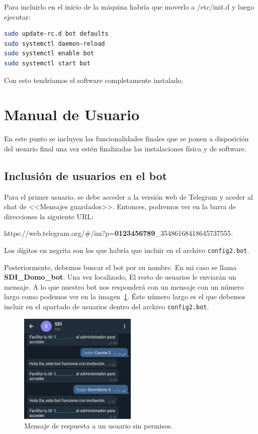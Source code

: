 Para incluirlo en el inicio de la máquina habría que moverlo a /etc/init.d y luego ejecutar: 
\begin{lstlisting}[language=sh, firstnumber=0, caption={Líneas para incluir el demonio en el inicio.}]  
sudo update-rc.d bot defaults
sudo systemctl daemon-reload
sudo systemctl enable bot
sudo systemctl start bot
\end{lstlisting}  

Con esto tendríamos el software completamente instalado.

\section{Manual de Usuario}
En este punto se incluyen las funcionalidades finales que se ponen a disposición del usuario final una vez estén finalizadas las instalaciones física y de software.

\subsection{Inclusión de usuarios en el bot}
Para el primer usuario, se debe acceder a la versión web de Telegram y aceder al chat de <<Mensajes guardados>>. Entonces, podremos ver en la barra de direcciones la siguiente URL:

\mbox{https://web.telegram.org/#/im?p=\textbf{0123456789}\_35486168418645737555}. 

Los dígitos en negrita son los que habría que incluir en el archivo \texttt{config2.bot}.

Posteriormente, debemos buscar el bot por su nombre. En mi caso se llama \textbf{SDI\_Domo\_bot}.
Una vez localizado, El resto de usuarios le enviarán un mensaje. A lo que nuestro bot nos responderá con un mensaje con un número largo como podemos ver en la imagen~\ref{Bot:SinPermisos}. Éste número largo es el que debemos incluir en el apartado de usuarios dentro del archivo \texttt{config2.bot}.

\begin{figure}[h]
\centering
\includegraphics[width=0.5\textwidth]{img/SalidasBot/botSinPermisos.jpeg}
\caption{Mensaje de respuesta a un usuario sin permisos.}\label{Bot:SinPermisos}
\end{figure}

